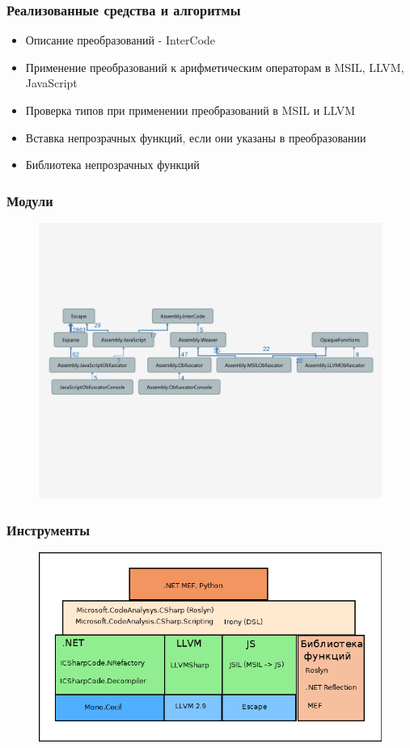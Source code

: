\documentclass[10pt]{beamer}
\begin{document}
\begin{frame}
\frametitle{Реализованные средства и алгоритмы}
\begin{itemize}
  \item Описание преобразований - InterCode
  \item Применение преобразований к арифметическим операторам в MSIL, LLVM, JavaScript
  \item Проверка типов при применении преобразований в MSIL и LLVM
  \item Вставка непрозрачных функций, если они указаны в преобразовании
  \item Библиотека непрозрачных функций
\end{itemize}
\end{frame}

\begin{frame}
\frametitle{Модули}
\begin{figure}[H]
  \center
  \includegraphics[width=1.0\linewidth]{DependenciesGraph.png}
\end{figure}
\end{frame}

\begin{frame}
\frametitle{Инструменты}
\begin{figure}[H]
  \center
  \includegraphics[width=1.0\linewidth]{Tools.png}
\end{figure}
\end{frame}
\end{document}
